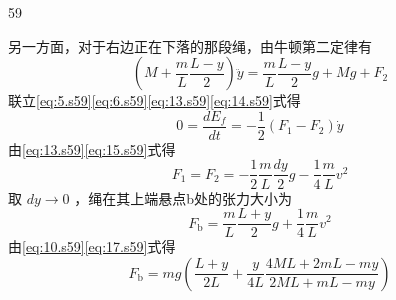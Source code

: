 \begin{solution}{59}
\begin{subsolution}
        另一方面，对于右边正在下落的那段绳，由牛顿第二定律有
        \begin{equation}
            \left(M + \frac {m}{L} \frac {L - y}{2}\right) \ddot{y} = \frac {m}{L} \frac {L - y}{2} g + M g + F _ {2}
            \label{eq:14.s59}
        \end{equation}
        联立\eqref{eq:5.s59}\eqref{eq:6.s59}\eqref{eq:13.s59}\eqref{eq:14.s59}式得
        \begin{equation}
            0 = \frac {d E _ {f}}{d t} = - \frac {1}{2} (F _ {1} - F _ {2}) \dot{y}
            \label{eq:15.s59}
        \end{equation}
        由\eqref{eq:13.s59}\eqref{eq:15.s59}式得
        \begin{equation}
            F _ {1} = F _ {2} = - \frac {1}{2} \frac {m}{L} \frac {d y}{2} g - \frac {1}{4} \frac {m}{L} v^{2}
            \label{eq:16.s59}
        \end{equation}
        取 $dy \to 0$ ，绳在其上端悬点b处的张力大小为
        \begin{equation}
            F _ {\mathrm{b}} = \frac {m}{L} \frac {L + y}{2} g + \frac {1}{4} \frac {m}{L} v^{2}
            \label{eq:17.s59}
        \end{equation}
        由\eqref{eq:10.s59}\eqref{eq:17.s59}式得
        \begin{equation}
            F _ {\mathrm{b}} = m g \left(\frac {L + y}{2 L} + \frac {y}{4 L} \frac {4 M L + 2 m L - m y}{2 M L + m L - m y}\right)
            \label{eq:18.s59}
        \end{equation}


\end{subsolution}
\end{solution}
